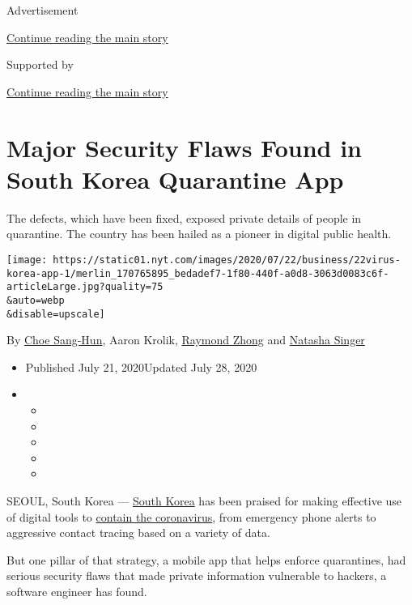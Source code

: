 Advertisement

\protect\hyperlink{after-top}{Continue reading the main story}

Supported by

\protect\hyperlink{after-sponsor}{Continue reading the main story}

\hypertarget{major-security-flaws-found-in-south-korea-quarantine-app}{%
\section{Major Security Flaws Found in South Korea Quarantine
App}\label{major-security-flaws-found-in-south-korea-quarantine-app}}

The defects, which have been fixed, exposed private details of people in
quarantine. The country has been hailed as a pioneer in digital public
health.

\texttt{[image: https://static01.nyt.com/images/2020/07/22/business/22virus-korea-app-1/merlin\_170765895\_bedadef7-1f80-440f-a0d8-3063d0083c6f-articleLarge.jpg?quality=75\\\&auto=webp\\\&disable=upscale]}

By \href{https://www.nytimes.com/by/choe-sang-hun}{Choe Sang-Hun}, Aaron
Krolik, \href{https://www.nytimes.com/by/raymond-zhong}{Raymond Zhong}
and \href{https://www.nytimes.com/by/natasha-singer}{Natasha Singer}

\begin{itemize}
\item
  Published July 21, 2020Updated July 28, 2020
\item
  \begin{itemize}
  \item
  \item
  \item
  \item
  \item
  \end{itemize}
\end{itemize}

SEOUL, South Korea ---
\href{https://www.nytimes.com/2020/07/28/world/asia/south-korea-satellites-rockets.html}{South
Korea} has been praised for making effective use of digital tools to
\href{https://www.nytimes.com/2020/03/23/world/asia/coronavirus-south-korea-flatten-curve.html}{contain
the coronavirus}, from emergency phone alerts to aggressive contact
tracing based on a variety of data.

But one pillar of that strategy, a mobile app that helps enforce
quarantines, had serious security flaws that made private information
vulnerable to hackers, a software engineer has found.

